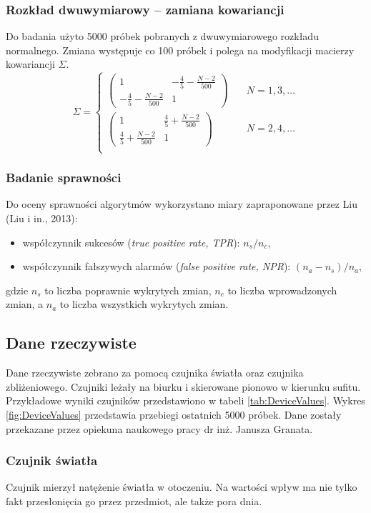 \subsubsection*{Rozkład dwuwymiarowy -- zamiana kowariancji}
Do badania użyto 5000 próbek pobranych z dwuwymiarowego rozkładu normalnego.
Zmiana występuje co 100 próbek
i polega na modyfikacji macierzy kowariancji $\Sigma$.
\[ \Sigma =
  \begin{cases}
    \begin{pmatrix} 1 & -\frac{4}{5} - \frac{N-2}{500} \\ -\frac{4}{5} - \frac{N-2}{500} & 1 \end{pmatrix} & \quad N = 1,3,\ldots\\
    \begin{pmatrix} 1 & \frac{4}{5} + \frac{N-2}{500} \\ \frac{4}{5} + \frac{N-2}{500} & 1 \end{pmatrix} & \quad N = 2,4,\ldots\\
  \end{cases}
\]
\subsubsection*{Badanie sprawności}
Do oceny sprawności algorytmów wykorzystano miary zapraponowane przez Liu (Liu i in., 2013):
\begin{itemize}
  \item współczynnik sukcesów (\textit{true positive rate, TPR}): $n_{s}/n_{c}$,
  \item współczynnik fałszywych alarmów (\textit{false positive rate, NPR}): $(n_{a}-n_{s})/n_{a}$,
\end{itemize}
gdzie $n_{s}$ to liczba poprawnie wykrytych zmian, $n_{c}$ to liczba wprowadzonych zmian,
a $n_{a}$ to liczba wszystkich wykrytych zmian.

\subsection*{Dane rzeczywiste}
Dane rzeczywiste zebrano za pomocą czujnika światła oraz czujnika zbliżeniowego.
Czujniki leżały na biurku i skierowane pionowo w kierunku sufitu.
Przykładowe wyniki czujników przedstawiono w tabeli \ref{tab:DeviceValues}.
Wykres \ref{fig:DeviceValues} przedstawia przebiegi ostatnich 5000 próbek.
Dane zostały przekazane przez opiekuna naukowego pracy dr inż. Janusza Granata.
\subsubsection*{Czujnik światła}
Czujnik mierzył natężenie światła w otoczeniu.
Na wartości wpływ ma nie tylko fakt przesłonięcia go przez przedmiot,
ale także pora dnia.
